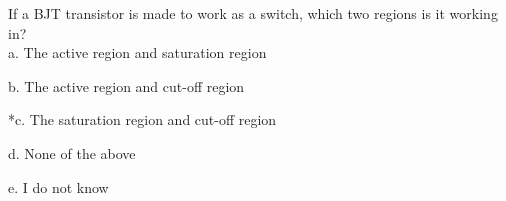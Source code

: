 
If a BJT transistor is made to work as a switch, which two regions is it working in? \\

a. The active region and saturation region

b. The active region and cut-off region

*c. The saturation region and cut-off region

d. None of the above

e. I do not know \\
